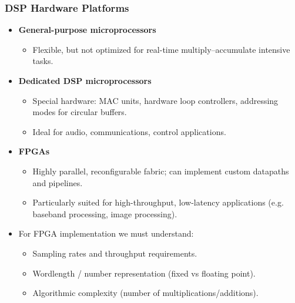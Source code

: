 \begin{frame}
	\frametitle{DSP Hardware Platforms}
	\begin{itemize}
		\item \textbf{General-purpose microprocessors}
		\begin{itemize}
			\item Flexible, but not optimized for real-time multiply–accumulate intensive tasks.
		\end{itemize}
		\item \textbf{Dedicated DSP microprocessors}
		\begin{itemize}
			\item Special hardware: MAC units, hardware loop controllers, addressing modes for circular buffers.
			\item Ideal for audio, communications, control applications.
		\end{itemize}
		\item \textbf{FPGAs}
		\begin{itemize}
			\item Highly parallel, reconfigurable fabric; can implement custom datapaths and pipelines.
			\item Particularly suited for high-throughput, low-latency applications (e.g. baseband processing, image processing).
		\end{itemize}
		\item For FPGA implementation we must understand:
		\begin{itemize}
			\item Sampling rates and throughput requirements.
			\item Wordlength / number representation (fixed vs floating point).
			\item Algorithmic complexity (number of multiplications/additions).
		\end{itemize}
	\end{itemize}
\end{frame}

